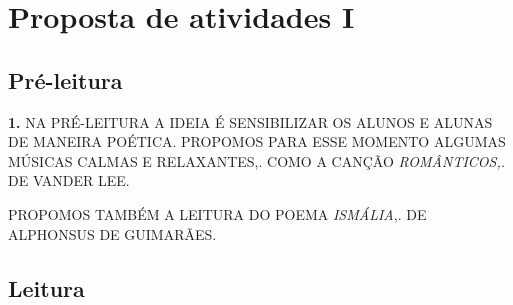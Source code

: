 \documentclass{extarticle}
\begin{document}
\section{Proposta de atividades I}

\subsection{Pré-leitura}






\textbf{1.} NA PRÉ-LEITURA A IDEIA É SENSIBILIZAR OS ALUNOS E ALUNAS DE
MANEIRA POÉTICA. PROPOMOS PARA ESSE MOMENTO ALGUMAS MÚSICAS CALMAS E
RELAXANTES,. COMO A CANÇÃO \emph{ROMÂNTICOS,.} DE VANDER LEE.

PROPOMOS TAMBÉM A LEITURA DO POEMA \emph{ISMÁLIA},. DE ALPHONSUS DE
GUIMARÃES.

\subsection{Leitura}


\end{document}
